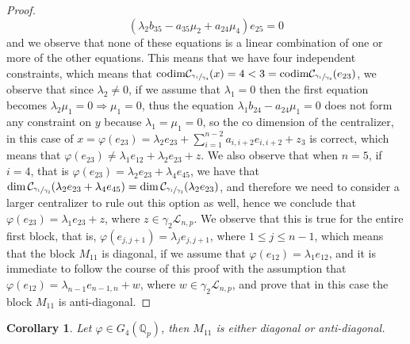 \documentclass[12pt]{article}
\newtheorem{corollary}[theorem]{Corollary}
\begin{document}
\begin{proof}
\[(\lambda_2 b_{35}-a_{35}\mu_2+a_{24}\mu_4)e_{25}=0\] and we observe that none of these equations is a linear combination of one or more of the other equations. This means that we have four independent constraints, which means that $\mathrm{codim}\mathcal{C}_{\sfrac{\gamma_1}{\gamma_4}}(x)=4<3=\mathrm{codim}\mathcal{C}_{\sfrac{\gamma_1}{\gamma_4}}(e_{23})$, we observe that since $\lambda_2\neq 0$, if we assume that $\lambda_1=0$ then the first equation becomes $\lambda_2\mu_1=0\Rightarrow\mu_1=0$, thus the equation $\lambda_1 b_{24}-a_{24}\mu_1=0$ does not form any constraint on $y$ because $\lambda_1=\mu_1=0$, so the co dimension of the centralizer, in this case of $x=\varphi(e_{23})=\lambda_2 e_{23}+\sum_{i=1}^{n-2}a_{i,i+2}e_{i,i+2}+z_3$ is correct, which means that $\varphi(e_{23})\neq\lambda_1 e_{12}+\lambda_2 e_{23}+z$. We also observe that when $n=5$, if $i=4$, that is $\varphi(e_{23})=\lambda_2 e_{23}+\lambda_4 e_{45}$, we have that $\dim\mathcal{C}_{\sfrac{\gamma_1}{\gamma_2}}(\lambda_2 e_{23}+\lambda_4 e_{45})=\dim\mathcal{C}_{\sfrac{\gamma_1}{\gamma_2}}(\lambda_2 e_{23})$, and therefore we need to consider a larger centralizer to rule out this option as well, hence we conclude that $\varphi(e_{23})=\lambda_1 e_{23}+z$, where $z\in\gamma_2\mathcal{L}_{n,p}$. We observe that this is true for the entire first block, that is, $\varphi(e_{j,j+1})=\lambda_j e_{j,j+1}$, where $1\leq j\leq n-1$, which means that the block $M_{11}$ is diagonal, if we assume that $\varphi(e_{12})=\lambda_1 e_{12}$, and it is immediate to follow the course of this proof with the assumption that $\varphi(e_{12})=\lambda_{n-1}e_{n-1,n}+w$, where $w\in\gamma_2\mathcal{L}_{n,p}$, and prove that in this case the block $M_{11}$ is anti-diagonal.
\end{proof}
\begin{corollary}
\label{m11.n.4}
Let $\varphi\in G_4(\mathbb{Q}_p)$, then $M_{11}$ is either diagonal or anti-diagonal.
\end{corollary}
\end{document}
